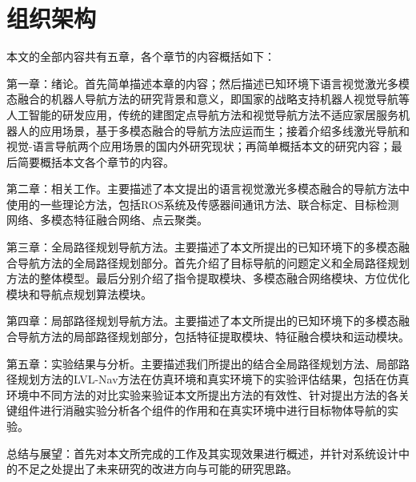 \section{组织架构}
	本文的全部内容共有五章，各个章节的内容概括如下：

	第一章：绪论。首先简单描述本章的内容；然后描述已知环境下语言视觉激光多模态融合的机器人导航方法的研究背景和意义，即国家的战略支持机器人视觉导航等人工智能的研发应用，传统的建图定点导航方法和视觉导航方法不适应家居服务机器人的应用场景，基于多模态融合的导航方法应运而生；接着介绍多线激光导航和视觉-语言导航两个应用场景的国内外研究现状；再简单概括本文的研究内容；最后简要概括本文各个章节的内容。

	第二章：相关工作。主要描述了本文提出的语言视觉激光多模态融合的导航方法中使用的一些理论方法，包括ROS系统及传感器间通讯方法、联合标定、目标检测网络、多模态特征融合网络、点云聚类。

	第三章：全局路径规划导航方法。主要描述了本文所提出的已知环境下的多模态融合导航方法的全局路径规划部分。首先介绍了目标导航的问题定义和全局路径规划方法的整体模型。最后分别介绍了指令提取模块、多模态融合网络模块、方位优化模块和导航点规划算法模块。

	第四章：局部路径规划导航方法。主要描述了本文所提出的已知环境下的多模态融合导航方法的局部路径规划部分，包括特征提取模块、特征融合模块和运动模块。

	第五章：实验结果与分析。主要描述我们所提出的结合全局路径规划方法、局部路径规划方法的LVL-Nav方法在仿真环境和真实环境下的实验评估结果，包括在仿真环境中不同方法的对比实验来验证本文所提出方法的有效性、针对提出方法的各关键组件进行消融实验分析各个组件的作用和在真实环境中进行目标物体导航的实验。

	总结与展望：首先对本文所完成的工作及其实现效果进行概述，并针对系统设计中的不足之处提出了未来研究的改进方向与可能的研究思路。





